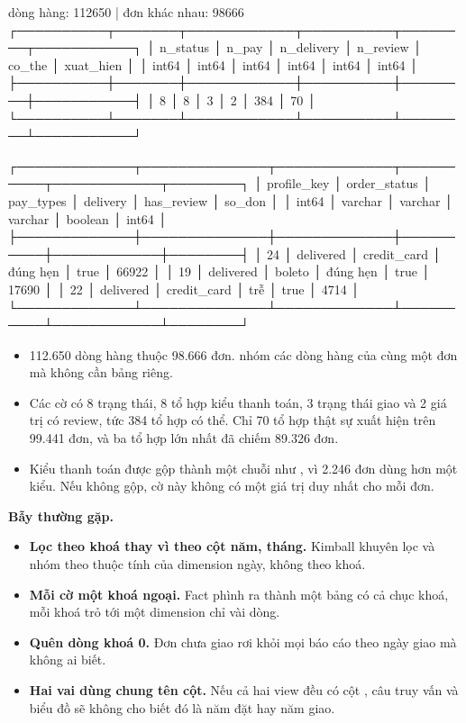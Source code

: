 \begin{codeblock}
dòng hàng: 112650 | đơn khác nhau: 98666
┌──────────┬───────┬────────────┬──────────┬────────┬───────────┐
│ n_status │ n_pay │ n_delivery │ n_review │ co_the │ xuat_hien │
│  int64   │ int64 │   int64    │  int64   │ int64  │   int64   │
├──────────┼───────┼────────────┼──────────┼────────┼───────────┤
│        8 │     8 │          3 │        2 │    384 │        70 │
└──────────┴───────┴────────────┴──────────┴────────┴───────────┘

┌─────────────┬──────────────┬─────────────┬──────────┬────────────┬────────┐
│ profile_key │ order_status │  pay_types  │ delivery │ has_review │ so_don │
│    int64    │   varchar    │   varchar   │ varchar  │  boolean   │ int64  │
├─────────────┼──────────────┼─────────────┼──────────┼────────────┼────────┤
│          24 │ delivered    │ credit_card │ đúng hẹn │ true       │  66922 │
│          19 │ delivered    │ boleto      │ đúng hẹn │ true       │  17690 │
│          22 │ delivered    │ credit_card │ trễ      │ true       │   4714 │
└─────────────┴──────────────┴─────────────┴──────────┴────────────┴────────┘
\end{codeblock}

\begin{itemize}
  \item 112.650 dòng hàng thuộc 98.666 đơn.  nhóm các dòng hàng của cùng một đơn mà không cần bảng riêng.
  \item Các cờ có 8 trạng thái, 8 tổ hợp kiểu thanh toán, 3 trạng thái giao và 2 giá trị có review, tức 384 tổ hợp có thể. Chỉ 70 tổ hợp thật sự xuất hiện trên 99.441 đơn, và ba tổ hợp lớn nhất đã chiếm 89.326 đơn.
  \item Kiểu thanh toán được gộp thành một chuỗi như , vì 2.246 đơn dùng hơn một kiểu. Nếu không gộp, cờ này không có một giá trị duy nhất cho mỗi đơn.
\end{itemize}

\begin{luuy}
\textbf{Bẫy thường gặp.}
\begin{itemize}
  \item \textbf{Lọc theo khoá  thay vì theo cột năm, tháng.} Kimball khuyên lọc và nhóm theo thuộc tính của dimension ngày, không theo khoá.
  \item \textbf{Mỗi cờ một khoá ngoại.} Fact phình ra thành một bảng có cả chục khoá, mỗi khoá trỏ tới một dimension chỉ vài dòng.
  \item \textbf{Quên dòng khoá 0.} Đơn chưa giao rơi khỏi mọi báo cáo theo ngày giao mà không ai biết.
  \item \textbf{Hai vai dùng chung tên cột.} Nếu cả hai view đều có cột , câu truy vấn và biểu đồ sẽ không cho biết đó là năm đặt hay năm giao.
\end{itemize}
\end{luuy}

